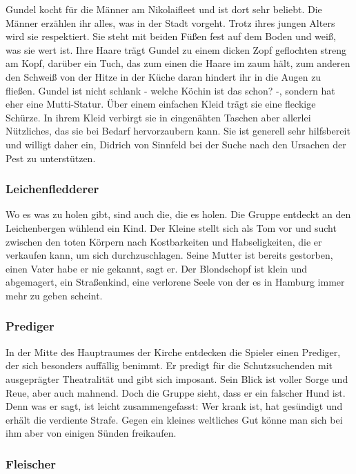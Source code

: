 Gundel kocht für die Männer am Nikolaifleet und ist dort sehr beliebt. Die Männer erzählen ihr alles, was in der Stadt vorgeht. Trotz ihres jungen Alters wird sie respektiert. Sie steht mit beiden Füßen fest auf dem Boden und weiß, was sie wert ist. Ihre Haare trägt Gundel zu einem dicken Zopf geflochten streng am Kopf, darüber ein Tuch, das zum einen die Haare im zaum hält, zum anderen den Schweiß von der Hitze in der Küche daran hindert ihr in die Augen zu fließen. Gundel ist nicht schlank - welche Köchin ist das schon? -, sondern hat eher eine Mutti-Statur. Über einem einfachen Kleid trägt sie eine fleckige Schürze. In ihrem Kleid verbirgt sie in eingenähten Taschen aber allerlei Nützliches, das sie bei Bedarf hervorzaubern kann. Sie ist generell sehr hilfsbereit und willigt daher ein, Didrich von Sinnfeld bei der Suche nach den Ursachen der Pest zu unterstützen.

\subsubsection*{Leichenfledderer}
\label{Leichenfledderer}

Wo es was zu holen gibt, sind auch die, die es holen. Die Gruppe entdeckt an den Leichenbergen wühlend ein Kind. Der Kleine stellt sich als Tom vor und sucht zwischen den toten Körpern nach Kostbarkeiten und Habseligkeiten, die er verkaufen kann, um sich durchzuschlagen. Seine Mutter ist bereits gestorben, einen Vater habe er nie gekannt, sagt er. Der Blondschopf ist klein und abgemagert, ein Straßenkind, eine verlorene Seele von der es in Hamburg immer mehr zu geben scheint.

\subsubsection*{Prediger}
\label{Prediger}

In der Mitte des Hauptraumes der Kirche entdecken die Spieler einen Prediger, der sich besonders auffällig benimmt. Er predigt für die Schutzsuchenden mit ausgeprägter Theatralität und gibt sich imposant. Sein Blick ist voller Sorge und Reue, aber auch mahnend. Doch die Gruppe sieht, dass er ein falscher Hund ist. Denn was er sagt, ist leicht zusammengefasst: Wer krank ist, hat gesündigt und erhält die verdiente Strafe. Gegen ein kleines weltliches Gut könne man sich bei ihm aber von einigen Sünden freikaufen.

\subsubsection*{Fleischer}
\label{Fleischer}

